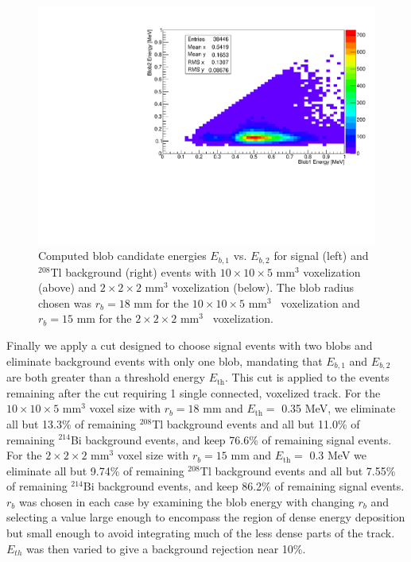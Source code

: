\documentclass[a4paper,11pt]{article}
\begin{document}
\begin{figure}[!htb]
	\includegraphics[scale = 0.35]{fig/blob1vsblob2_Paolina222_Bi214.pdf}
	\caption{Computed blob candidate energies $E_{b,1}$ vs. $E_{b,2}$ for signal (left) and $^{208}$Tl background (right) events with $10 \times 10 \times 5$ mm$^3$ voxelization (above) and 
		$2 \times 2 \times 2$ mm$^3$ voxelization (below).  The blob radius chosen was $r_b = 18$ mm for the $10 \times 10 \times 5$ mm$^3$~ voxelization and $r_b = 15$ mm for the $2 \times 2 \times 2$ mm$^3$~ voxelization.} \label{fig.blobcuts}
\end{figure}

Finally we apply a cut designed to choose signal events with two blobs and eliminate background events with only one blob, mandating that $E_{b,1}$ and $E_{b,2}$ are both greater than a threshold energy $E_{\mathrm{th}}$.  This cut is applied to the events remaining after the cut requiring 1 single connected, voxelized track.  For the $10 \times 10 \times 5$ mm$^3$ voxel size with $r_b = 18$ mm and $E_{\mathrm{th}} =$ 0.35 MeV, we eliminate all but 13.3\% of remaining $^{208}$Tl background events and all but 11.0\% of remaining $^{214}$Bi background events, and keep 76.6\% of remaining signal events.  For the $2 \times 2 \times 2$ mm$^3$ voxel size with $r_b = 15$ mm and $E_{\mathrm{th}} =$ 0.3 MeV we eliminate all but 9.74\% of remaining $^{208}$Tl background events and all but 7.55\% of remaining $^{214}$Bi background events, and keep 86.2\% of remaining signal events.  $r_{b}$ was chosen in each case by examining the blob energy with changing $r_b$ and selecting a value large enough to encompass the region of dense energy deposition but small enough to avoid integrating much of the less dense parts of the track.  $E_{th}$ was then varied to give a background rejection near 10\%.
\end{document}
